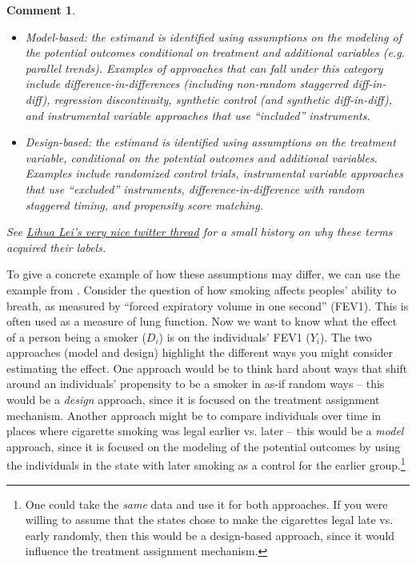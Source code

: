 \documentclass{tufte-handout}
\theoremstyle{break}
\newtheorem{cmt}{Comment}
\begin{document}
\begin{boxF}
  \begin{cmt}
    \begin{itemize}
      \item Model-based: the estimand is
            identified using assumptions on the modeling of the potential outcomes conditional on treatment and additional variables
            (e.g. parallel trends). Examples of approaches that can fall under this category include difference-in-differences (including non-random staggerred diff-in-diff), regression discontinuity, synthetic control (and synthetic diff-in-diff), and instrumental variable approaches that use ``included'' instruments.
      \item Design-based: the estimand is identified using assumptions on the treatment variable,
            conditional on the potential outcomes and additional variables. Examples include randomized control trials, instrumental variable approaches that use ``excluded'' instruments, difference-in-difference with \emph{random} staggered timing, and propensity score matching.
    \end{itemize}
    See \href{https://twitter.com/lihua_lei_stat/status/1479700463343714306?s=20&t=pKi-XTp3e89Rn8KV8b3KEA}{Lihua Lei's very nice twitter thread} for a small history on why these terms acquired their labels.
  \end{cmt}
\end{boxF}

To give a concrete example of how these assumptions may differ, we can use the example from \citet{robins1992estimating}. Consider the question of how smoking affects peoples' ability to breath, as measured by ``forced expiratory volume in one second'' (FEV1). This is often used as a measure of lung function. Now we want to know what the effect of a person being a smoker ($D_{i}$) is on the individuals' FEV1 ($Y_{i}$).  The two approaches (model and design) highlight the different ways you might consider estimating the effect. One approach would be to think hard about ways that shift around an individuals' propensity to be a smoker in as-if random ways -- this would be a \emph{design} approach, since it is focused on the treatment assignment mechanism.  Another approach might be to compare individuals over time in places where cigarette smoking was legal earlier vs. later -- this would be a \emph{model} approach, since it is focused on the modeling of the potential outcomes by using the individuals in the state with later smoking as a control for the earlier group.\footnote{One could take the \emph{same} data and use it for both approaches. If you were willing to assume that the states chose to make the cigarettes legal late vs. early randomly, then this would be a design-based approach, since it would influence the treatment assignment mechanism.}
\end{document}
